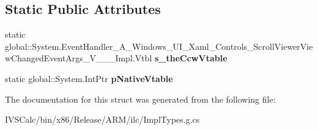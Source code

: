 \subsection*{Static Public Attributes}
\begin{DoxyCompactItemize}
\item 
\mbox{\label{struct_system_1_1_event_handler___a___windows___u_i___xaml___controls___scroll_viewer_view_changd9b2e3e9495d0e3c92d7a0d6cea8508d_a82b3e542ecfb3d030f0837271eb57530}} 
static global\+::\+System.\+Event\+Handler\+\_\+\+A\+\_\+\+Windows\+\_\+\+U\+I\+\_\+\+Xaml\+\_\+\+Controls\+\_\+\+Scroll\+Viewer\+View\+Changed\+Event\+Args\+\_\+\+V\+\_\+\+\_\+\+\_\+\+Impl.\+Vtbl {\bfseries s\+\_\+the\+Ccw\+Vtable}
\item 
\mbox{\label{struct_system_1_1_event_handler___a___windows___u_i___xaml___controls___scroll_viewer_view_changd9b2e3e9495d0e3c92d7a0d6cea8508d_a20c6fc20160b3e4d59134ae995fcb637}} 
static global\+::\+System.\+Int\+Ptr {\bfseries p\+Native\+Vtable}
\end{DoxyCompactItemize}


The documentation for this struct was generated from the following file\+:\begin{DoxyCompactItemize}
\item 
I\+V\+S\+Calc/bin/x86/\+Release/\+A\+R\+M/ilc/Impl\+Types.\+g.\+cs\end{DoxyCompactItemize}
